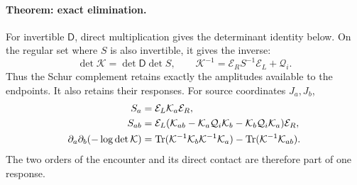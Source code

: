 \documentclass[aps,prx,onecolumn,10pt,notitlepage,nofootinbib,longbibliography]{revtex4-2}
\numberwithin{equation}{section}
\numberwithin{table}{section}
\newcommand{\Tr}{\operatorname{Tr}}
\begin{document}
\paragraph*{Theorem: exact elimination.}
For invertible ${\mathsf D}$, direct multiplication gives the determinant identity below. On the regular set where $S$ is also invertible, it gives the inverse:
\begin{equation}
 \det {\mathcal K}=\det {\mathsf D}\det S,\qquad {\mathcal K}^{-1}={\mathcal E_R}S^{-1}{\mathcal E_L}+{\mathcal Q_i}.
 \label{eq:schur}
\end{equation}
Thus the Schur complement retains exactly the amplitudes available to the endpoints. It also retains their responses. For source coordinates $J_a,J_b$,
\begin{align}
 S_a&={\mathcal E_L}{\mathcal K}_a{\mathcal E_R},\notag\\
 S_{ab}&={\mathcal E_L}({\mathcal K}_{ab}-{\mathcal K}_a{\mathcal Q_i}{\mathcal K}_b-{\mathcal K}_b{\mathcal Q_i}{\mathcal K}_a){\mathcal E_R},\label{eq:schurderivative}\\
 \partial_a\partial_b(-\log\det {\mathcal K})
 &=\Tr({\mathcal K}^{-1}{\mathcal K}_b{\mathcal K}^{-1}{\mathcal K}_a)-\Tr({\mathcal K}^{-1}{\mathcal K}_{ab}).
 \label{eq:twoinsertions}
\end{align}
The two orders of the encounter and its direct contact are therefore part of one response.
\end{document}
